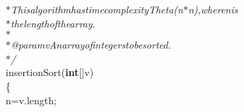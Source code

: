 {{\begin{tabbing}
{\it{\hspace{30pt}$\ast$\hspace{6pt}This\hspace{6pt}algorithm\hspace{6pt}has\hspace{6pt}time\hspace{6pt}complexity\hspace{6pt}Theta(n$\ast$n),\hspace{6pt}where\hspace{6pt}n\hspace{6pt}is}}\\
{\it{\hspace{30pt}$\ast$\hspace{6pt}the\hspace{6pt}length\hspace{6pt}of\hspace{6pt}the\hspace{6pt}array.}}\\
{\it{\hspace{30pt}$\ast$\hspace{6pt}}}\\
{\it{\hspace{30pt}$\ast$\hspace{6pt}@param\hspace{12pt}v\hspace{18pt}An\hspace{6pt}array\hspace{6pt}of\hspace{6pt}integers\hspace{6pt}to\hspace{6pt}be\hspace{6pt}sorted.}}\\
{\it{\hspace{30pt}$\ast$/}}\\
\hspace{6pt}insertionSort({\textbf{int}}{[}{]}\hspace{6pt}v)\\
\hspace{24pt}\{\\
\hspace{6pt}n\hspace{6pt}=\hspace{6pt}v.length;\\

\end{tabbing}}}
